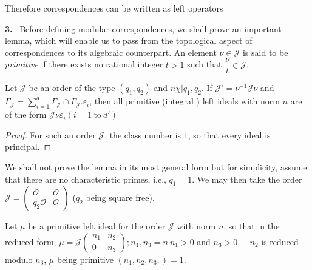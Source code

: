   Therefore correspondences can be written as left operators 

\textbf{3.}~ Before defining modular correspondences, we shall prove an
  important lemma, which will enable us to pass from the topological
  aspect of correspondences to its algebraic counterpart. An element
  $\nu \in \mathcal{J}$ is said to be \textit{ primitive } if there
  exists no rational integer $t > 1$ such that $\dfrac{\nu}{t} \in
  \mathcal{J}$.  

\begin{lemma*}
  Let $\mathcal{J} $ be an order of the type $(q_1, q_2)$ and $n
  \chi| q_1, q_2$. If $\mathcal{J'} = \nu ^{-1} \mathcal{J} \nu$ and
  $\Gamma _{\mathcal{J}} = \sum\limits^d _{ i = 1} \Gamma _\mathcal{J} \cap
  \Gamma _\mathcal{J}. \varepsilon _i $, then all primitive
  (integral ) left ideals with norm $n$ are of the form $\mathcal{J}
  \nu \varepsilon _i (i = 1 ~\text{to}~ d ' )$ 
\end{lemma*}

\begin{proof}
  For such an order $\mathcal{J}$, the class number is $1$, so that
  every ideal is principal.  
\end{proof}

We shall not prove the lemma in its most general form but for
simplicity, assume that there are no characteristic primes, i.e., $q_1
= 1$. We may then take the order $\mathcal{J} =  \begin{pmatrix}
  \mathscr{O} & \mathscr{O} \\ q_2 \mathscr{O} &
  \mathscr{O}\end{pmatrix}$ ($q_2$ being square free).  

Let $\mu$ be a primitive left ideal for the order $\mathcal{J}$ with
norm $n$, so that in the reduced form, $\mu =
\mathcal{J}  \begin{pmatrix} n_1 & n_2 \\ 0 & n_3 \end{pmatrix}; n_1,
n_3 = n~  n_1 > 0 $  and $n_3 > 0, \quad n_2 $ is reduced modulo $n_3$,
$\mu$ being primitive $(n_1, n_2, n_3, ) = 1$.  

